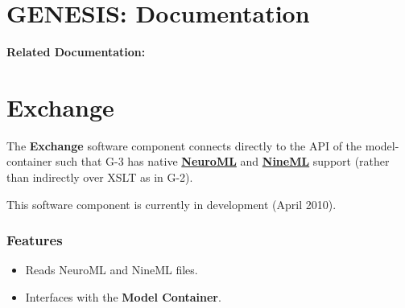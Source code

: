 \documentclass[12pt]{article}
\begin{document}
\section*{GENESIS: Documentation}

{\bf Related Documentation:}

\section*{Exchange}

The {\bf Exchange} software component connects directly to the API of
the model-container such that G-3 has native
\href{http://www.neuroml.org/}{\bf NeuroML} and
\href{http://www.nineml.org/}{\bf NineML} support (rather than indirectly
over XSLT as in G-2).

This software component is currently in development (April 2010).


\subsubsection*{Features}

\begin{itemize}

\item Reads NeuroML and NineML files.

\item Interfaces with the {\bf Model Container}.

\end{itemize}
\end{document}
